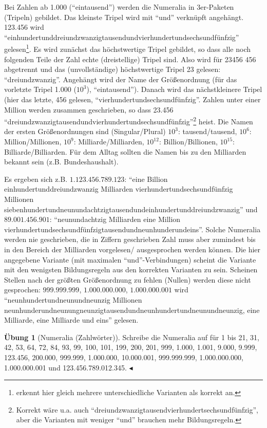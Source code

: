 \documentclass[a4paper]{book}%
\newcommand{\topicend}{
      $\blacktriangleleft$
}
\theoremstyle{definition}
\newtheorem{uebung}{Übung}
\begin{document}
Bei Zahlen ab 1.000 (\enquote{eintausend}) werden die Numeralia in 3er-Paketen (Tripeln) gebildet. Das kleinste Tripel wird mit \enquote{und} verknüpft angehängt. 123.456 wird \enquote{einhundertunddreiundzwanzigtausendundvierhundertundsechsundfünfzig} gelesen\footnote{\citep{DudenGrammatik2016} erkennt hier gleich mehrere unterschiedliche Varianten als korrekt an.}. Es wird zunächst das höchstwertige Tripel gebildet, so dass alle noch folgenden Teile der Zahl echte (dreistellige) Tripel sind. Also wird für 23456 456 abgetrennt und das (unvollständige) höchstwertige Tripel 23 gelesen: \enquote{dreiundzwanzig}. Angehängt wird der Name der Größenordnung (für das vorletzte Tripel 1.000 ($10^3$), \enquote{eintausend}). Danach wird das nächstkleinere Tripel (hier das letzte, 456 gelesen, \enquote{vierhundertundsechsundfünfzig}. Zahlen unter einer Million werden zusammen geschrieben, so dass 23.456 \enquote{dreiundzwanzigtausendundvierhundertundsechsundfünfzig}\footnote{Korrekt wäre u.a. auch \enquote{dreiundzwanzigtausendvierhundertsechsundfünfzig}, aber die Varianten mit weniger \enquote{und} brauchen mehr Bildungsregeln.} heist. Die Namen der ersten Größenordnungen sind (Singular/Plural) $10^3$: tausend/tausend, $10^6$: Million/Millionen, $10^9$: Milliarde/Milliarden, $10^{12}$: Billion/Billionen, $10^{15}$: Billiarde/Billiarden. Für dem Alltag sollten die Namen bis zu den Milliarden bekannt sein (z.B. Bundeshaushalt).

Es ergeben sich z.B. $1.123.456.789.123$: \enquote{eine Billion einhundertunddreiundzwanzig Milliarden vierhundertundsechsundfünfzig Millionen siebenhundertundneunundachtzigtausendundeinhundertunddreiundzwanzig} und $89.001.456.901$: \enquote{neunundachtzig Milliarden eine Million vierhundertundsechsundfünfzigtausendundneunhunderundeins}. Solche Numeralia werden nie geschrieben, die in Ziffern geschrieben Zahl muss aber zumindest bis in den Bereich der Milliarden vorgelesen/ ausgesprochen werden können. Die hier angegebene Variante (mit maximalen \enquote{und}-Verbindungen) scheint die Variante mit den wenigsten Bildungsregeln aus den korrekten Varianten zu sein. Scheinen Stellen nach der größten Größenordnung zu fehlen (Nullen) werden diese nicht gesprochen: $999.999.999$, $1.000.000.000$, $1.000.000.001$ wird \enquote{neunhundertundneunundneunzig Millionen neunhunderundneunungneunzigtausendundneunhundertundneunundneunzig, eine Milliarde, eine Milliarde und eins} gelesen.

\begin{uebung}[Numeralia (Zahlwörter)]
    Schreibe die Numeralia auf für 1 bis 21, 31, 42, 53, 64, 72, 84, 93, 99, 100, 101, 199, 200, 201, 999, 1.000, 1.001, 9.000, 9.999, 123.456, 200.000, 999.999, 1.000.000, 10.000.001, 999.999.999, 1.000.000.000, 1.000.000.001 und 123.456.789.012.345.\topicend
\end{uebung}
\end{document}
